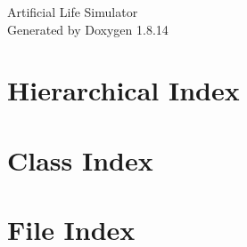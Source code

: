\documentclass[twoside]{book}
\newcommand{\+}{\discretionary{\mbox{\scriptsize$\hookleftarrow$}}{}{}}
\newcommand{\clearemptydoublepage}{%
  \newpage{\pagestyle{empty}\cleardoublepage}%
}
\begin{document}
\hypersetup{pageanchor=false,
             bookmarksnumbered=true,
             pdfencoding=unicode
            }
\begin{titlepage}
\vspace*{7cm}
\begin{center}%
{\Large Artificial Life Simulator }\\
\vspace*{1cm}
{\large Generated by Doxygen 1.8.14}\\
\end{center}
\end{titlepage}
\clearemptydoublepage
{}
\tableofcontents
\clearemptydoublepage
{}
\hypersetup{pageanchor=true}

\chapter{Hierarchical Index}

\chapter{Class Index}

\chapter{File Index}

\end{document}
